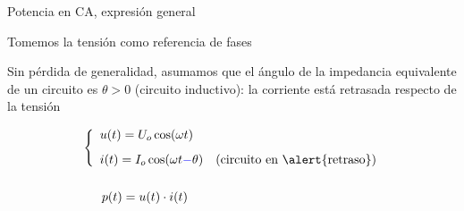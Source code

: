 \documentclass[aspectratio=169, usenames,svgnames,dvipsnames]{beamer}
\begin{document}
\begin{frame}{Potencia en CA, \hspace{3mm}expresión general}

    \vspace{1mm}
    Tomemos la tensión como referencia de fases

    \vspace{4mm}
    Sin pérdida de generalidad, asumamos que el ángulo de la impedancia equivalente de un circuito es \(\theta > 0\) (circuito \alert{inductivo}): la corriente está retrasada respecto de la tensión 

    \begin{align*}
        & \left\{ \begin{array}{l}
            u(t) = U_o \cos (\omega t)\\[8pt]
            i(t) = I_o \cos (\omega t {\color{blue}-} \theta) \quad \text{(circuito en \alert{retraso})} \\
        \end{array} \right.
        \\[14pt]
        & \left. \begin{array}{l}
            \;\;\; p(t) = u(t) \cdot i(t)      
          \end{array} \right.
    \end{align*}
\end{frame}

\end{document}
